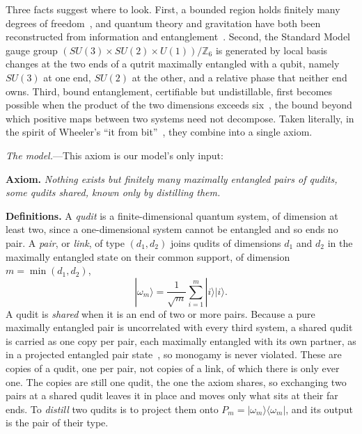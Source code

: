 \documentclass[aps,prl,reprint,superscriptaddress,longbibliography,nofootinbib,floatfix]{revtex4-2}
\theoremstyle{definition}
\newcommand{\ket}[1]{|#1\rangle}
\newcommand{\bra}[1]{\langle#1|}
\begin{document}
Three facts suggest where to look. First, a bounded region holds finitely many degrees of freedom~\cite{bekenstein1981,thooft1993,susskind1995}, and quantum theory and gravitation have both been reconstructed from information and entanglement~\cite{hardy2001,chiribella2011,jacobson1995,vanraamsdonk2010}. Second, the Standard Model gauge group $(SU(3)\times SU(2)\times U(1))/\mathbb{Z}_{6}$ is generated by local basis changes at the two ends of a qutrit maximally entangled with a qubit, namely $SU(3)$ at one end, $SU(2)$ at the other, and a relative phase that neither end owns. Third, bound entanglement, certifiable but undistillable, first becomes possible when the product of the two dimensions exceeds six~\cite{horodecki1996,phorodecki1997,horodecki1998,horodecki2009}, the bound beyond which positive maps between two systems need not decompose. Taken literally, in the spirit of Wheeler's ``it from bit''~\cite{wheeler1990}, they combine into a single axiom.

\emph{The model.}---This axiom is our model's only input:

\smallskip
\noindent\textbf{Axiom.} \textit{Nothing exists but finitely many maximally entangled pairs of qudits, some qudits shared, known only by distilling them.}
\smallskip

\noindent\textbf{Definitions.} A \emph{qudit} is a finite-dimensional quantum system, of dimension at least two, since a one-dimensional system cannot be entangled and so ends no pair. A \emph{pair}, or \emph{link}, of type $(d_{1},d_{2})$ joins qudits of dimensions $d_{1}$ and $d_{2}$ in the maximally entangled state on their common support, of dimension $m=\min(d_{1},d_{2})$,
\begin{equation}
\ket{\omega_{m}} = \frac{1}{\sqrt{m}}\sum_{i=1}^{m}\ket{i}\ket{i}.
\label{eq:pair}
\end{equation}
A qudit is \emph{shared} when it is an end of two or more pairs. Because a pure maximally entangled pair is uncorrelated with every third system, a shared qudit is carried as one copy per pair, each maximally entangled with its own partner, as in a projected entangled pair state~\cite{verstraete2004}, so monogamy is never violated. These are copies of a qudit, one per pair, not copies of a link, of which there is only ever one. The copies are still one qudit, the one the axiom shares, so exchanging two pairs at a shared qudit leaves it in place and moves only what sits at their far ends. To \emph{distill} two qudits is to project them onto $P_{m}=\ket{\omega_{m}}\!\bra{\omega_{m}}$, and its output is the pair of their type.
\end{document}
